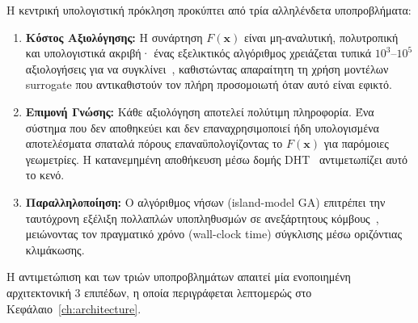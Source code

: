 Η κεντρική υπολογιστική πρόκληση προκύπτει από τρία αλληλένδετα υποπροβλήματα:
\begin{enumerate}
    \item \textbf{Κόστος Αξιολόγησης:} Η συνάρτηση $F(\mathbf{x})$ είναι μη-αναλυτική, πολυτροπική και υπολογιστικά ακριβή· ένας εξελικτικός αλγόριθμος χρειάζεται τυπικά $10^3$--$10^5$ αξιολογήσεις για να συγκλίνει~\cite{jin2011surrogate}, καθιστώντας απαραίτητη τη χρήση μοντέλων surrogate που αντικαθιστούν τον πλήρη προσομοιωτή όταν αυτό είναι εφικτό.
    \item \textbf{Επιμονή Γνώσης:} Κάθε αξιολόγηση αποτελεί πολύτιμη πληροφορία. Ένα σύστημα που δεν αποθηκεύει και δεν επαναχρησιμοποιεί ήδη υπολογισμένα αποτελέσματα σπαταλά πόρους επαναϋπολογίζοντας το $F(\mathbf{x})$ για παρόμοιες γεωμετρίες. Η κατανεμημένη αποθήκευση μέσω δομής DHT~\cite{stoica2001chord} αντιμετωπίζει αυτό το κενό.
    \item \textbf{Παραλληλοποίηση:} Ο αλγόριθμος νήσων (island-model GA) επιτρέπει την ταυτόχρονη εξέλιξη πολλαπλών υποπληθυσμών σε ανεξάρτητους κόμβους~\cite{cantupaz2000parallel,alba1999survey}, μειώνοντας τον πραγματικό χρόνο (wall-clock time) σύγκλισης μέσω οριζόντιας κλιμάκωσης.
\end{enumerate}

Η αντιμετώπιση και των τριών υποπροβλημάτων απαιτεί μία ενοποιημένη αρχιτεκτονική 3 επιπέδων, η οποία περιγράφεται λεπτομερώς στο Κεφάλαιο~\ref{ch:architecture}.

